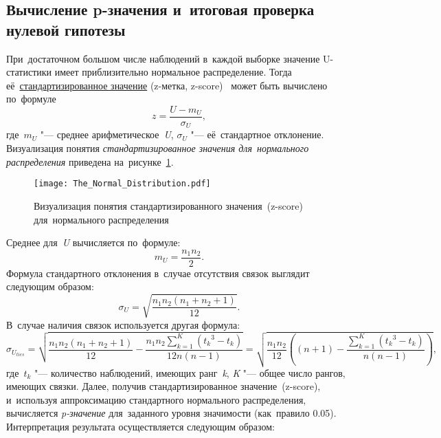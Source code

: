 \documentclass[]{scrreprt}
\begin{document}
\subsection{Вычисление p-значения и~итоговая проверка нулевой гипотезы}
При~достаточном большом числе наблюдений в~каждой выборке значение U-статистики имеет приблизительно нормальное распределение. Тогда её~\href{https://en.wikipedia.org/wiki/Standard_score}{стандартизированное значение} (z-метка, \foreignlanguage{english}{z-score})~\cite{Wiki:z-score} может быть вычислено по~формуле
\begin{equation}\label{eq:z-score}
z = \frac{U-m_{U}}{\sigma_{U}},
\end{equation}
где~${\textstyle m_{U}}$ "--- среднее арифметическое~\textit{U}, ${\textstyle \sigma_{U}}$ "--- её~стандартное отклонение. Визуализация понятия \emph{стандартизированное значения для~нормального распределения} приведена на~рисунке~\ref{fig:z-score}.
\begin{figure}[ht]
	\centering
	\texttt{[image: The\_Normal\_Distribution.pdf]}
	\caption{Визуализация понятия стандартизированного значения~(z-score) для~нормального распределения \cite{Wiki:z-score}}\label{fig:z-score}
\end{figure}
Среднее для~\textit{U} вычисляется по~формуле:
\begin{equation}\label{eq:U-mean}
m_{U} = \frac{n_{1}n_{2}}{2}.
\end{equation}
Формула стандартного отклонения в~случае отсутствия связок выглядит следующим образом:
\begin{equation}\label{eq:standard-deviation-no-ties}
\sigma_{U} =  \sqrt{\frac{n_{1}n_{2}(n_{1}+n_{2}+1)}{12}}.
\end{equation}
В~случае наличия связок используется другая формула:
\begin{equation}\label{eq:standard-deviation-ties}
\sigma_{U_{ties}} = \sqrt{\frac{n_{1}n_{2}(n_{1}+n_{2}+1)}{12} - \frac{n_{1}n_{2}\sum_{k=1}^{K}({t_{k}}^{3} - t_{k})}{12n(n-1)}} = \sqrt{\frac{n_{1}n_{2}}{12} \left((n+1)-\frac{\sum_{k=1}^{K}({t_{k}}^{3} - t_{k})}{n(n-1)}\right)},
\end{equation}
где~${\textstyle t_{k}}$ "--- количество наблюдений, имеющих ранг~\textit{k}, \textit{K} "--- общее число рангов, имеющих связки.
Далее, получив стандартизированное значение~(z-score), и~используя аппроксимацию стандартного нормального распределения, вычисляется \textit{p-значение} для~заданного уровня значимости (как~правило 0.05). Интерпретация результата осуществляется следующим образом:
\end{document}
